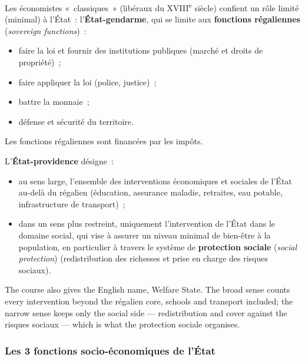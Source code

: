 \begin{definition}
  Les économistes «~classiques~» (libéraux du XVIII\textsuperscript{e} siècle)
  confient un rôle limité (minimal) à l'État~: l'\textbf{État-gendarme}, qui se
  limite aux \textbf{fonctions régaliennes} (\textit{sovereign functions})~:
  \begin{itemize}
    \item faire la loi et fournir des institutions publiques (marché et droits de
      propriété)~;
    \item faire appliquer la loi (police, justice)~;
    \item battre la monnaie~;
    \item défense et sécurité du territoire.
  \end{itemize}
  Les fonctions régaliennes sont financées par les impôts.
\end{definition}

\begin{definition}
  L'\textbf{État-providence} désigne~:
  \begin{itemize}
    \item au sens large, l'ensemble des interventions économiques et sociales de
      l'État au-delà du régalien (éducation, assurance maladie, retraites, eau
      potable, infrastructure de transport)~;
    \item dans un sens plus restreint, uniquement l'intervention de l'État dans le
      domaine social, qui vise à assurer un niveau minimal de bien-être à la
      population, en particulier à travers le système de \textbf{protection
      sociale} (\textit{social protection}) (redistribution des richesses et prise
      en charge des risques sociaux).
  \end{itemize}
\end{definition}

The course also gives the English name, Welfare State. The broad sense counts
every intervention beyond the régalien core, schools and transport included; the
narrow sense keeps only the social side --- redistribution and cover against the
risques sociaux --- which is what the protection sociale organises.

\subsubsection{Les 3 fonctions socio-économiques de l'État}

